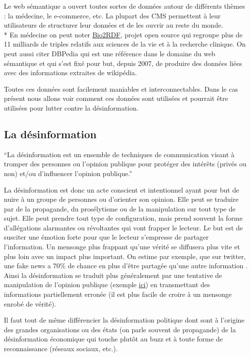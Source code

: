 Le web sémantique a ouvert toutes sortes de données autour de différents thèmes : la médecine, le e-commerce, etc. La plupart des CMS permettent à leur utilisateurs de structurer leur données et de les ouvrir au reste du monde.
\\*
En médecine on peut noter \href{http://bio2rdf.org/}{Bio2RDF}, projet open source qui regroupe plus de 11 milliards de triples relatifs aux sciences de la vie et à la recherche clinique. On peut aussi citer DBPedia qui est une référence dans le domaine du web sémantique et qui s'est fixé pour but, depuis 2007, de produire des données liées avec des informations extraites de wikipédia.

Toutes ces données sont facilement maniables et interconnectables. Dans le cas présent nous allons voir comment ces données sont utilisées et pourrait être utilisées pour lutter contre la désinformation.

\subsection{La désinformation}

\enquote{La désinformation est un ensemble de techniques de communication visant à tromper des personnes ou l'opinion publique pour protéger des intérêts (privés ou non) et/ou d'influencer l'opinion publique.} \cite{wiki:desinformation}

La désinformation est donc un acte conscient et intentionnel ayant pour but de nuire à un groupe de personnes ou d'orienter son opinion. Elle peut se traduire par de la propagande, du prosélytisme ou de la manipulation sur tout type de sujet. Elle peut prendre tout type de configuration, mais prend souvent la forme d'allégations alarmantes ou révoltantes qui vont frapper le lecteur. Le but est de susciter une émotion forte pour que le lecteur s'empresse de partager l'information. Un mensonge plus frappant qu'une vérité se diffusera plus vite et plus loin avec un impact plus important. On estime par exemple, que sur twitter, une fake news a 70\% de chance en plus d'être partagée qu'une autre information \cite{vosoughi2017rumor}. 
Ainsi la désinformation se traduit plus généralement par une tentative de manipulation de l'opinion publique (exemple \href{https://www.20minutes.fr/societe/2261439-20180426-video-evacuation-tolbiac-retour-naissance-fake-news}{ici}) en transmettant des informations partiellement erronée (il est plus facile de croire à un mensonge enrobé de vérité). 

Il faut tout de même différencier la désinformation politique dont sont à l'origine des grandes organisations ou des états (on parle souvent de propagande) de la désinformation économique qui touche plutôt au buzz et à toute forme de reconnaissance (réseaux sociaux, etc.).

